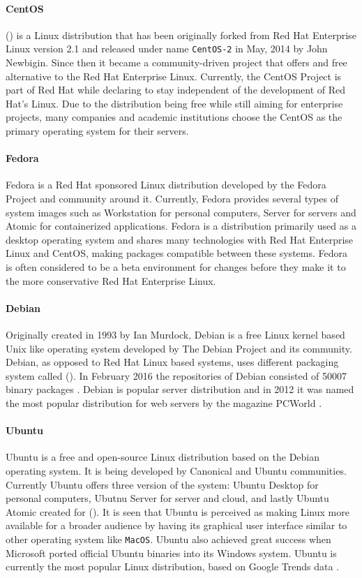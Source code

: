 \paragraph{CentOS}
 () is a Linux distribution that has been originally forked from Red Hat Enterprise Linux version 2.1 and released under name \texttt{CentOS-2} in May, 2014 \cite{centosfirsts} by John Newbigin. Since then it became a community-driven project that offers and free alternative to the Red Hat Enterprise Linux. Currently, the CentOS Project is part of Red Hat while declaring to stay independent of the development of Red Hat's Linux. Due to the distribution being free while still aiming for enterprise projects, many companies and academic institutions choose the CentOS as the primary operating system for their servers.
\paragraph{Fedora}
Fedora is a Red Hat sponsored Linux distribution developed by the Fedora Project and community around it. Currently, Fedora provides several types of system images such as Workstation for personal computers, Server for servers and Atomic for containerized applications. Fedora is a distribution primarily used as a desktop operating system and shares many technologies with Red Hat Enterprise Linux and CentOS, making packages compatible between these systems. Fedora is often considered to be a beta environment for changes before they make it to the more conservative Red Hat Enterprise Linux.
\paragraph{Debian}
Originally created in 1993 by Ian Murdock, Debian is a free Linux kernel based Unix like operating system developed by The Debian Project and its community. Debian, as opposed to Red Hat Linux based systems, uses different packaging system called  (). In February 2016 the repositories of Debian consisted of 50007 binary packages \cite{debianfifty}. Debian is popular server distribution and in 2012 it was named the most popular distribution for web servers by the magazine PCWorld \cite{debianpopular}.
\paragraph{Ubuntu}
Ubuntu is a free and open-source Linux distribution based on the Debian operating system. It is being developed by Canonical and Ubuntu communities. Currently Ubuntu offers three version of the system: Ubuntu Desktop for personal computers, Ubutnu Server for server and cloud, and lastly Ubuntu Atomic created for  (). It is seen that Ubuntu is perceived as making Linux more available for a broader audience by having its graphical user interface similar to other operating system like \texttt{MacOS}. Ubuntu also achieved great success when Microsoft ported official Ubuntu binaries into its Windows system. Ubuntu is currently the most popular Linux distribution, based on Google Trends data \cite{linuxtrends}.
